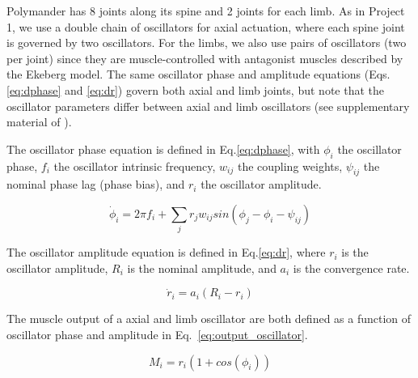 \documentclass{cmc}
\begin{document}
Polymander has 8 joints along its spine and 2 joints for each limb. As in Project 1, we use a double chain of oscillators for axial actuation, where each spine joint is governed by two oscillators. For the limbs, we also use pairs of oscillators (two per joint) since they are muscle-controlled with antagonist muscles described by the Ekeberg model. The same oscillator phase and amplitude equations (Eqs. \ref{eq:dphase} and \ref{eq:dr}) govern both axial and limb joints, but note that the oscillator parameters differ between axial and limb oscillators (see supplementary material of \cite{ijspeert2007swimming}).

The oscillator phase equation is defined in Eq.\ref{eq:dphase}, with $ \phi_i $ the oscillator phase, $f_i$ the oscillator intrinsic frequency, $ w_{ij} $ the coupling weights, $ \psi_{ij} $ the nominal phase lag (phase bias), and $ r_i $ the oscillator amplitude.

\begin{equation}
  \label{eq:dphase}
  \dot{\phi}_i = 2 \pi f_i + \sum_j r_j w_{ij} sin(\phi_j - \phi_i - \psi_{ij})
\end{equation}

The oscillator amplitude equation is defined in Eq.\ref{eq:dr}, where $r_i$ is the oscillator amplitude, $R_i$ is the nominal amplitude, and $a_i$ is the convergence rate.

\begin{equation}
  \label{eq:dr}
  \dot{r}_i = a_i (R_i - r_i)
\end{equation}

The muscle output of a axial and limb oscillator are both defined as a function of oscillator phase and amplitude in Eq.~\ref{eq:output_oscillator}.

\begin{equation}
  \label{eq:output_oscillator}
  M_i = r_i(1 + cos(\phi_i))
\end{equation}
\end{document}
